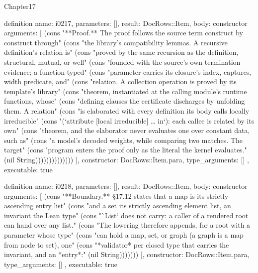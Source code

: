 \begin{lexlean}{Chapter17}
\begin{semanticmodule}
definition{
  name: i0217,
  parameters: [],
  result: DocRows::Item,
  body: constructor{
    arguments: [
      (cons "**Proof.** The proof follows the source term construct by construct through" (cons "the library's compatibility lemmas. A recursive definition's relation is" (cons "proved by the same recursion as the definition, structural, mutual, or well" (cons "founded with the source's own termination evidence; a function-typed" (cons "parameter carries its closure's index, captures, width predicate, and" (cons "relation. A collection operation is proved by its template's library" (cons "theorem, instantiated at the calling module's runtime functions, whose" (cons "defining clauses the certificate discharges by unfolding them. A relation" (cons "is elaborated with every definition its body calls locally irreducible" (cons "(`attribute [local irreducible] … in`): each callee is related by its own" (cons "theorem, and the elaborator never evaluates one over constant data, such as" (cons "a model's decoded weights, while comparing two matches. The target" (cons "program enters the proof only as the literal the kernel evaluates." (nil String))))))))))))))
    ],
    constructor: DocRows::Item.para,
    type_arguments: []
  },
  executable: true
}

definition{
  name: i0218,
  parameters: [],
  result: DocRows::Item,
  body: constructor{
    arguments: [
      (cons "**Boundary.** §17.12 states that a map is its strictly ascending entry list" (cons "and a set its strictly ascending element list, an invariant the Lean type" (cons "`List` does not carry: a caller of a rendered root can hand over any list." (cons "The lowering therefore appends, for a root with a parameter whose type" (cons "can hold a map, set, or graph (a graph is a map from node to set), one" (cons "*validator* per closed type that carries the invariant, and an *entry*:" (nil String)))))))
    ],
    constructor: DocRows::Item.para,
    type_arguments: []
  },
  executable: true
}


\end{semanticmodule}
\end{lexlean}

